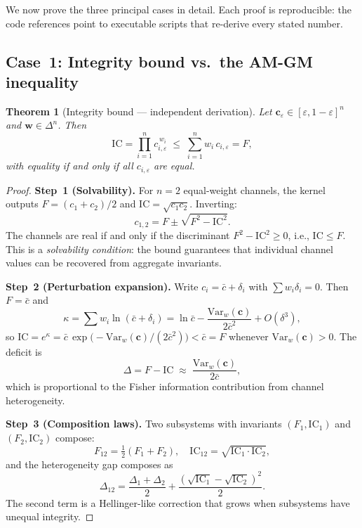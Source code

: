 \documentclass[
  aps,
  prd,
  twocolumn,
  superscriptaddress,
  nofootinbib,
  floatfix
]{revtex4-2}
\newtheorem{theorem}{Theorem}
\newcommand{\eps}{\varepsilon}
\newcommand{\beq}{\begin{equation}}
\newcommand{\eeq}{\end{equation}}
\newcommand{\tvec}{\mathbf{c}}
\newcommand{\wvec}{\mathbf{w}}
\newcommand{\IC}{\mathrm{IC}}
\begin{document}
We now prove the three principal cases in detail.  Each proof
is reproducible: the code references point to executable
scripts that re-derive every stated number.

\subsection{Case~1: Integrity bound vs.\ the AM-GM inequality}

\begin{theorem}[Integrity bound --- independent derivation]
\label{thm:icf}
Let $\tvec_\eps \in [\eps, 1{-}\eps]^n$ and
$\wvec \in \Delta^n$.  Then
\beq
  \IC = \prod_{i=1}^n c_{i,\eps}^{\,w_i}
  \;\leq\;
  \sum_{i=1}^n w_i\, c_{i,\eps} = F,
\eeq
with equality if and only if all $c_{i,\eps}$ are equal.
\end{theorem}

\begin{proof}
\textbf{Step~1 (Solvability).}
For $n = 2$ equal-weight channels, the kernel outputs
$F = (c_1 + c_2)/2$ and $\IC = \sqrt{c_1 c_2}$.
Inverting:
\beq
  c_{1,2} = F \pm \sqrt{F^2 - \IC^2}.
  \label{eq:solvability}
\eeq
The channels are real if and only if the discriminant
$F^2 - \IC^2 \geq 0$, i.e., $\IC \leq F$.  This is a
\emph{solvability condition}: the bound guarantees that
individual channel values can be recovered from aggregate
invariants.

\textbf{Step~2 (Perturbation expansion).}
Write $c_i = \bar{c} + \delta_i$ with $\sum w_i \delta_i = 0$.
Then $F = \bar{c}$ and
\beq
  \kappa = \sum w_i \ln(\bar{c} + \delta_i)
  = \ln\bar{c} - \frac{\mathrm{Var}_w(\tvec)}{2\bar{c}^2}
    + O(\delta^3),
  \label{eq:kappa_expand}
\eeq
so $\IC = e^\kappa = \bar{c}\,\exp\!\bigl(
  -\mathrm{Var}_w(\tvec)/(2\bar{c}^2)\bigr) < \bar{c} = F$
whenever $\mathrm{Var}_w(\tvec) > 0$.  The deficit is
\beq
  \Delta = F - \IC
  \;\approx\; \frac{\mathrm{Var}_w(\tvec)}{2\bar{c}},
  \label{eq:gap_var}
\eeq
which is proportional to the Fisher information
contribution from channel heterogeneity.

\textbf{Step~3 (Composition laws).}
Two subsystems with invariants $(F_1, \IC_1)$ and
$(F_2, \IC_2)$ compose:
\beq
  F_{12} = \tfrac{1}{2}(F_1 + F_2), \quad
  \IC_{12} = \sqrt{\IC_1 \cdot \IC_2},
\eeq
and the heterogeneity gap composes as
\beq
  \Delta_{12} = \frac{\Delta_1 + \Delta_2}{2}
  + \frac{(\sqrt{\IC_1} - \sqrt{\IC_2})^2}{2}.
  \label{eq:gap_comp}
\eeq
The second term is a Hellinger-like correction that grows
when subsystems have unequal integrity.
\end{proof}
\end{document}
